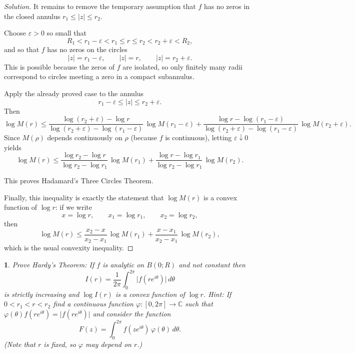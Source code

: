\documentclass[12pt, a4paper]{report}
\theoremstyle{spaced}
\newtheorem{exercise}{}
\newcommand{\setexercise}[1]{\setcounter{exercise}{#1-1}}
\begin{document}
\begin{proof}[Solution]
	\medskip
	It remains to remove the temporary assumption that \(f\) has no zeros in the closed annulus \(r_1\le |z|\le r_2\).

	Choose \(\varepsilon>0\) so small that
	\[
		R_1<r_1-\varepsilon<r_1\le r\le r_2<r_2+\varepsilon<R_2,
	\]
	and so that \(f\) has no zeros on the circles
	\[
		|z|=r_1-\varepsilon,\qquad |z|=r,\qquad |z|=r_2+\varepsilon.
	\]
	This is possible because the zeros of \(f\) are isolated, so only finitely many radii correspond to circles meeting a zero in a compact subannulus.

	Apply the already proved case to the annulus
	\[
		r_1-\varepsilon\le |z|\le r_2+\varepsilon.
	\]
	Then
	\[
		\log M(r)\le
		\frac{\log(r_2+\varepsilon)-\log r}{\log(r_2+\varepsilon)-\log(r_1-\varepsilon)}\,
		\log M(r_1-\varepsilon)
		+
		\frac{\log r-\log(r_1-\varepsilon)}{\log(r_2+\varepsilon)-\log(r_1-\varepsilon)}\,
		\log M(r_2+\varepsilon).
	\]
	Since \(M(\rho)\) depends continuously on \(\rho\) (because \(f\) is continuous), letting \(\varepsilon\downarrow0\) yields
	\[
		\log M(r)\le
		\frac{\log r_2-\log r}{\log r_2-\log r_1}\,\log M(r_1)
		+
		\frac{\log r-\log r_1}{\log r_2-\log r_1}\,\log M(r_2).
	\]

	This proves Hadamard's Three Circles Theorem.

	\medskip
	Finally, this inequality is exactly the statement that \(\log M(r)\) is a convex function of \(\log r\): if we write
	\[
		x=\log r,\qquad x_1=\log r_1,\qquad x_2=\log r_2,
	\]
	then
	\[
		\log M(r)\le
		\frac{x_2-x}{x_2-x_1}\,\log M(r_1)
		+
		\frac{x-x_1}{x_2-x_1}\,\log M(r_2),
	\]
	which is the usual convexity inequality.
\end{proof}

\setexercise{6}
\begin{exercise}
	Prove Hardy's Theorem: If $f$ is analytic on $B(0;R)$ and not constant then
	\[
		I(r)=\frac{1}{2\pi}\int_{0}^{2\pi}\bigl|f(re^{i\theta})\bigr|\,d\theta
	\]
	is strictly increasing and $\log I(r)$ is a convex function of $\log r$.
	\emph{Hint:} If $0<r_1<r<r_2$ find a continuous function $\varphi:[0,2\pi]\to\mathbb{C}$ such that
	$\varphi(\theta)f(re^{i\theta})=\bigl|f(re^{i\theta})\bigr|$
	and consider the function
	\[
		F(z)=\int_{0}^{2\pi} f(ze^{i\theta})\,\varphi(\theta)\,d\theta.
	\]
	(Note that $r$ is fixed, so $\varphi$ may depend on $r$.)
\end{exercise}
\end{document}
